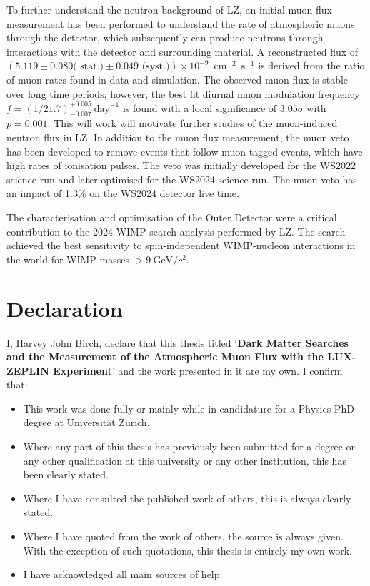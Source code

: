 \documentclass[a4paper,11pt,usegeometry]{scrreprt} %
\begin{document}
To further understand the neutron background of LZ, an initial muon flux measurement has been performed to understand the rate of atmospheric muons through the detector, which subsequently can produce neutrons through interactions with the detector and surrounding material. A reconstructed flux of $(5.119 \pm 0.080 \textrm{( stat.)} \pm 0.049 \textrm{ (syst.)})\times10^{-9}$~cm$^{-2}$~s$^{-1}$ is derived from the ratio of muon rates found in data and simulation. The observed muon flux is stable over long time periods; however, the best fit diurnal muon modulation frequency $f=(1/21.7)^{+0.005}_{-0.007}~\text{day}^{-1}$ is found with a local significance of $3.05\sigma$ with $p=0.001$. This will work will motivate further studies of the muon-induced neutron flux in LZ.
In addition to the muon flux measurement, the muon veto has been developed to remove events that follow muon-tagged events, which have high rates of ionisation pulses. The veto was initially developed for the WS2022 science run and later optimised for the WS2024 science run. The muon veto has an impact of 1.3\% on the WS2024 detector live time. 

The characterisation and optimisation of the Outer Detector were a critical contribution to the 2024 WIMP search analysis performed by LZ. The search achieved the best sensitivity to spin-independent WIMP-nucleon interactions in the world for WIMP masses $>9~\text{GeV}/c^2$.

\newpage\null\thispagestyle{empty}\newpage

\chapter*{Declaration}
\vskip 1in
I, Harvey John Birch, declare that this thesis titled ‘\textbf{Dark Matter Searches and the Measurement of the Atmospheric Muon Flux with the LUX-ZEPLIN Experiment}’ and the work presented in it are my own. I confirm that:
\bigbreak

\begin{itemize}
\item This work was done fully or mainly while in candidature for a Physics PhD degree at Universit\"at Z\"urich.
\item Where any part of this thesis has previously been submitted for a degree or any other qualification at this university or any other institution, this has been clearly stated.
\item Where I have consulted the published work of others, this is always clearly stated.
\item Where I have quoted from the work of others, the source is always given. With the exception of such quotations, this thesis is entirely my own work.
\item I have acknowledged all main sources of help.
\end{itemize}
\vskip 2in
\end{document}

